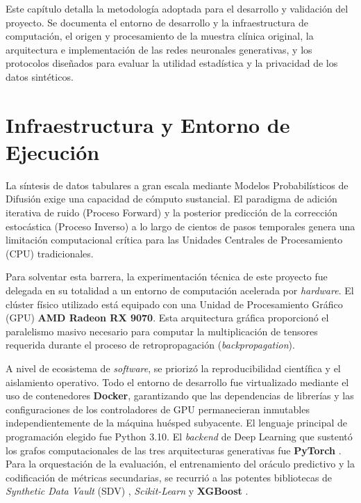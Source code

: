 
Este capítulo detalla la metodología adoptada para el desarrollo y validación del proyecto. Se documenta el entorno de desarrollo y la infraestructura de computación, el origen y procesamiento de la muestra clínica original, la arquitectura e implementación de las redes neuronales generativas, y los protocolos diseñados para evaluar la utilidad estadística y la privacidad de los datos sintéticos.

\setcounter{section}{0}
\section{Infraestructura y Entorno de Ejecución}

La síntesis de datos tabulares a gran escala mediante Modelos Probabilísticos de Difusión exige una capacidad de cómputo sustancial. El paradigma de adición iterativa de ruido (Proceso Forward) y la posterior predicción de la corrección estocástica (Proceso Inverso) a lo largo de cientos de pasos temporales genera una limitación computacional crítica para las Unidades Centrales de Procesamiento (CPU) tradicionales.

Para solventar esta barrera, la experimentación técnica de este proyecto fue delegada en su totalidad a un entorno de computación acelerada por \textit{hardware}. El clúster físico utilizado está equipado con una Unidad de Procesamiento Gráfico (GPU) \textbf{AMD Radeon RX 9070}. Esta arquitectura gráfica proporcionó el paralelismo masivo necesario para computar la multiplicación de tensores requerida durante el proceso de retropropagación (\textit{backpropagation}).

A nivel de ecosistema de \textit{software}, se priorizó la reproducibilidad científica y el aislamiento operativo. Todo el entorno de desarrollo fue virtualizado mediante el uso de contenedores \textbf{Docker}, garantizando que las dependencias de librerías y las configuraciones de los controladores de GPU permanecieran inmutables independientemente de la máquina huésped subyacente. El lenguaje principal de programación elegido fue Python 3.10. El \textit{backend} de Deep Learning que sustentó los grafos computacionales de las tres arquitecturas generativas fue \textbf{PyTorch} \parencite{paszke2019pytorch}. Para la orquestación de la evaluación, el entrenamiento del oráculo predictivo y la codificación de métricas secundarias, se recurrió a las potentes bibliotecas de \textit{Synthetic Data Vault} (SDV) \parencite{sdv2023}, \textit{Scikit-Learn} y \textbf{XGBoost} \parencite{chen2016xgboost}.

